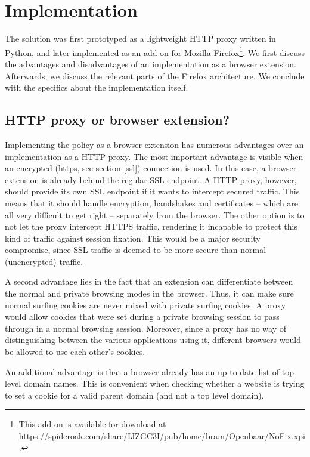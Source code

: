 \section{Implementation}

The solution was first prototyped as a lightweight HTTP proxy written in Python, and later implemented as an add-on for Mozilla Firefox\footnote{This add-on is available for download at \url{https://spideroak.com/share/IJZGC3I/pub/home/bram/Openbaar/NoFix.xpi}.}. We first discuss the advantages and disadvantages of an implementation as a browser extension. Afterwards, we discuss the relevant parts of the Firefox architecture. We conclude with the specifics about the implementation itself.

\subsection{HTTP proxy or browser extension?}\label{proxy-or-extension}

Implementing the policy as a browser extension has numerous advantages over an implementation as a HTTP proxy. The most important advantage is visible when an encrypted (\gls{https}, see section \ref{ssl}) connection is used. In this case, a browser extension is already behind the regular SSL endpoint. A HTTP proxy, however, should provide its own SSL endpoint if it wants to intercept secured traffic. This means that it should handle encryption, handshakes and certificates -- which are all very difficult to get right -- separately from the browser. The other option is to not let the proxy intercept HTTPS traffic, rendering it incapable to protect this kind of traffic against session fixation. This would be a major security compromise, since SSL traffic is deemed to be more secure than normal (unencrypted) traffic.

A second advantage lies in the fact that an extension can differentiate between the normal and private browsing modes in the browser. Thus, it can make sure normal surfing cookies are never mixed with private surfing cookies. A proxy would allow cookies that were set during a private browsing session to pass through in a normal browsing session. Moreover, since a proxy has no way of distinguishing between the various applications using it, different browsers would be allowed to use each other's cookies.

An additional advantage is that a browser already has an up-to-date list of top level domain names. This is convenient when checking whether a website is trying to set a cookie for a valid parent domain (and not a top level domain).

